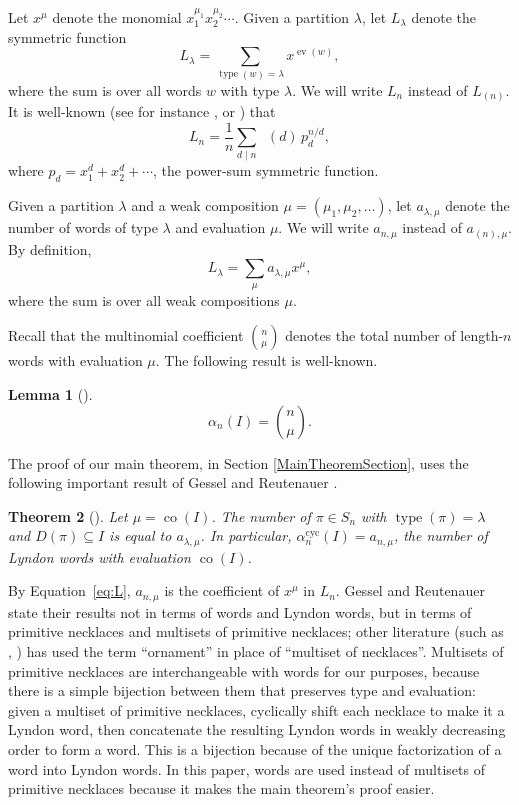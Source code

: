 \documentclass[12pt]{article}
\newcommand{\Perm}{S}
\newcommand{\alphacyc}{\alpha^{\text{cyc}}}
\DeclareMathOperator{\mob}{M\ddot{o}b}
\DeclareMathOperator{\type}{type}
\DeclareMathOperator{\ev}{ev}
\DeclareMathOperator{\co}{co}
\newtheorem{thm}{Theorem}[section]
\newtheorem{lem}[thm]{Lemma}
\theoremstyle{definition}
\begin{document}
Let $x^\mu$ denote the monomial $x_1^{\mu_1}x_2^{\mu_2}\cdots$. Given a partition $\lambda$, let $L_\lambda$ denote the symmetric function
\begin{equation}\label{eq:Ldef} L_\lambda = \sum_{\type(w) = \lambda} x^{\ev(w)}, \end{equation}
where the sum is over all words $w$ with type $\lambda$. We will write $L_n$ instead of $L_{(n)}$. It is well-known (see for instance \cite[eqn.\ (2.2)]{GR}, \cite[Exer.\ 7.89.a]{Stanley2} or \cite[Thm.\ 7.2]{Reutenauer}) that
\[ L_n = \frac{1}{n} \sum_{\text{$d \mid n$}} \mob(d)\,p_d^{n/d}, \]
where $p_d = x_1^d + x_2^d + \cdots$, the power-sum symmetric function.

Given a partition $\lambda$ and a weak composition $\mu = (\mu_1, \mu_2, \ldots)$, let $a_{\lambda,\mu}$ denote the number of words of type $\lambda$ and evaluation $\mu$. We will write $a_{n,\mu}$ instead of $a_{(n),\mu}$. By definition,
\begin{equation}\label{eq:L} 
L_\lambda = \sum_\mu a_{\lambda,\mu} x^\mu,
\end{equation}
where the sum is over all weak compositions $\mu$. 

Recall that the multinomial coefficient $\binom{n}{\mu}$ denotes the total number of length-$n$ words with evaluation $\mu$. The following result is well-known.

\begin{lem}[{\cite[Prop.\ 1.4.1]{Stanley1}}] \label{lem:multi}
$$\alpha_n(I) = \binom{n}{\mu}.$$
\end{lem}

The proof of our main theorem, in Section \ref{MainTheoremSection}, uses the following important result of Gessel and Reutenauer \cite{GR}.

\begin{thm}[{\cite[Cor.\ 2.2]{GR}}] \label{GRcor}
Let $\mu = \co(I)$. The number of $\pi \in \Perm_n$ with $\type(\pi) = \lambda$ and $D(\pi) \subseteq I$ is equal to $a_{\lambda,\mu}$.
In particular, $\alphacyc_n(I) = a_{n,\mu}$, the number of Lyndon words with evaluation $\co(I)$.
\end{thm}

By Equation~\eqref{eq:L}, $a_{n,\mu}$ is the coefficient of $x^\mu$ in $L_n$.
Gessel and Reutenauer \cite{GR} state their results not in terms of words and Lyndon words, but in terms of primitive necklaces and multisets of primitive necklaces; other literature (such as \cite{Reiner}, \cite{Steinhardt}) has used the term ``ornament'' in place of ``multiset of necklaces''. Multisets of primitive necklaces are interchangeable with words for our purposes, because there is a simple bijection between them that preserves type and evaluation: given a multiset of primitive necklaces, cyclically shift each necklace to make it a Lyndon word, then concatenate the resulting Lyndon words in weakly decreasing order to form a word. This is a bijection because of the unique factorization of a word into Lyndon words. In this paper, words are used instead of multisets of primitive necklaces because it makes the main theorem's proof easier.
\end{document}
